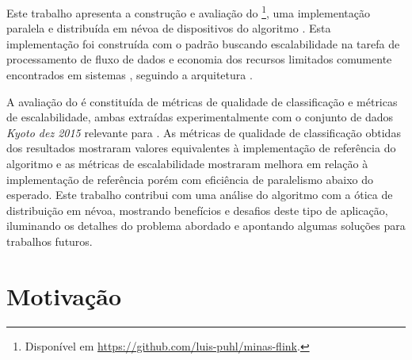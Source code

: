 
Este trabalho apresenta a construção e avaliação do \mfog\footnote{Disponível em
\url{https://github.com/luis-puhl/minas-flink}.}, uma implementação paralela e
distribuída em névoa de dispositivos \iot do algoritmo \minas.
Esta implementação foi construída com o padrão \mpi buscando escalabilidade na
tarefa de processamento de fluxo de dados e economia dos recursos limitados
comumente encontrados em sistemas \iot, seguindo a arquitetura \arch
\cite{Cassales2019}.

A avaliação do \mfog é constituída de métricas de qualidade de classificação e
métricas de escalabilidade, ambas extraídas experimentalmente com o conjunto de dados
\emph{Kyoto dez 2015} relevante para \nids.
% 
% 
As métricas de qualidade de classificação obtidas dos resultados mostraram
valores equivalentes à implementação de referência do algoritmo \minas e
as métricas de escalabilidade mostraram melhora em relação à implementação de
referência porém com eficiência de paralelismo abaixo do esperado.
Este trabalho contribui com uma análise do algoritmo \minas com a ótica de
distribuição em névoa, mostrando benefícios e desafios deste tipo de aplicação,
iluminando os detalhes do problema abordado e apontando algumas soluções para
trabalhos futuros.

\section{Motivação}\label{sec:motivo}


